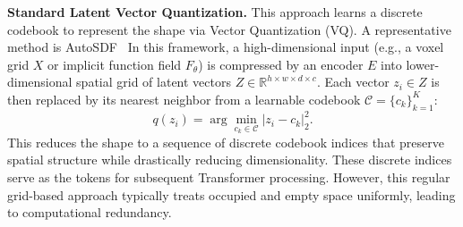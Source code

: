 \documentclass[../../book-main.tex]{subfiles}
\begin{document}
\textbf{Standard Latent Vector Quantization.} This approach learns a discrete
codebook to represent the shape via Vector Quantization (VQ). A
representative method is  AutoSDF~\cite{mittal2022autosdf} In this
framework, a high-dimensional
input (e.g., a voxel grid $X$ or  implicit function field $F_\theta$)
is compressed by an encoder $E$ into
lower-dimensional spatial grid of latent vectors $Z \in \mathbb{R}^{h
\times w \times d \times c}$.
Each vector $z_i \in Z$ is then replaced by its nearest neighbor from
a learnable codebook $\mathcal{C}=\{c_k\}_{k=1}^K$:
\begin{equation}
q(z_i) = \arg\min_{c_k \in \mathcal{C}} | z_i - c_k |_2^2.
\end{equation}
This reduces the shape to a sequence of discrete codebook indices that preserve
spatial structure while drastically reducing dimensionality. These
discrete indices
serve as the tokens for subsequent Transformer processing. However,
this regular grid-based approach typically treats occupied and empty
space uniformly, leading to computational redundancy.

\end{document}

